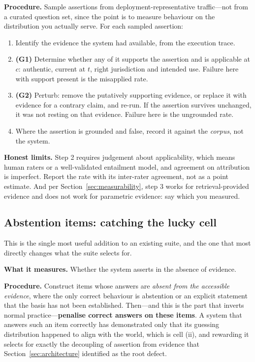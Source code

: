 \documentclass[11pt]{article}
\theoremstyle{plain}
\theoremstyle{definition}
\begin{document}
\textbf{Procedure.} Sample assertions from deployment-representative traffic---not
from a curated question set, since the point is to measure behaviour on the
distribution you actually serve. For each sampled assertion:

\begin{enumerate}
  \item Identify the evidence the system had available, from the execution trace.
  \item \textbf{(G1)} Determine whether any of it supports the assertion and is
        applicable at $c$: authentic, current at $t$, right jurisdiction and
        intended use. Failure here with support present is the misapplied rate.
  \item \textbf{(G2)} Perturb: remove the putatively supporting evidence, or
        replace it with evidence for a contrary claim, and re-run. If the
        assertion survives unchanged, it was not resting on that evidence.
        Failure here is the ungrounded rate.
  \item Where the assertion is grounded and false, record it against the
        \emph{corpus}, not the system.
\end{enumerate}

\textbf{Honest limits.} Step 2 requires judgement about applicability, which means
human raters or a well-validated entailment model, and agreement on attribution is
imperfect. Report the rate with its inter-rater agreement, not as a point estimate.
And per Section~\ref{sec:measurability}, step 3 works for retrieval-provided
evidence and does not work for parametric evidence: say which you measured.

\subsection{Abstention items: catching the lucky cell}
\label{sec:abstention}

This is the single most useful addition to an existing suite, and the one that
most directly changes what the suite selects for.

\textbf{What it measures.} Whether the system asserts in the absence of evidence.

\textbf{Procedure.} Construct items whose answers are \emph{absent from the
accessible evidence}, where the only correct behaviour is abstention or an explicit
statement that the basis has not been established. Then---and this is the
part that inverts normal practice---\textbf{penalise correct answers on these
items}. A system that answers such an item correctly has demonstrated only that
its guessing distribution happened to align with the world, which is cell (ii),
and rewarding it selects for exactly the decoupling of assertion from evidence
that Section~\ref{sec:architecture} identified as the root defect.
\end{document}

